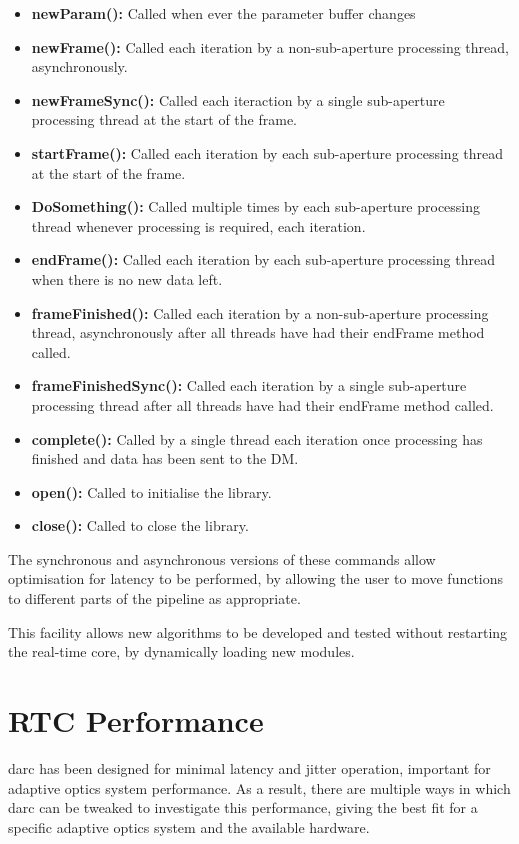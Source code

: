 \documentclass[a4,10pt]{article}
\begin{document}
\begin{itemize}
\item {\bf newParam():} Called when ever the parameter buffer changes
\item {\bf newFrame():} Called each iteration by a non-sub-aperture processing thread,
  asynchronously.
\item {\bf newFrameSync():} Called each iteraction by a single sub-aperture
  processing thread at the start of the frame.
\item {\bf startFrame():} Called each iteration by each sub-aperture
  processing thread at the start of the frame.
\item {\bf DoSomething():} Called multiple times by each sub-aperture
  processing thread whenever processing is required, each iteration.
\item {\bf endFrame():} Called each iteration by each sub-aperture
  processing thread when there is no new data left.
\item {\bf frameFinished():} Called each iteration by a non-sub-aperture
  processing thread, asynchronously after all threads have had their
  endFrame method called.
\item {\bf frameFinishedSync():} Called each iteration by a single sub-aperture
  processing thread after all threads have had their endFrame method
  called.
\item {\bf complete():} Called by a single thread each iteration once
  processing has finished and data has been sent to the DM.
\item {\bf open():} Called to initialise the library.
\item {\bf close():} Called to close the library.
\end{itemize}

The synchronous and asynchronous versions of these commands allow
optimisation for latency to be performed, by allowing the user to move
functions to different parts of the pipeline as appropriate.

This facility allows new algorithms to be developed and tested without
restarting the real-time core, by dynamically loading new modules.


\section{RTC Performance}
darc has been designed for minimal latency and jitter operation, important for
adaptive optics system performance.  As a result, there are multiple
ways in which darc can be tweaked to investigate this performance,
giving the best fit for a specific adaptive optics system and the
available hardware.
\end{document}
